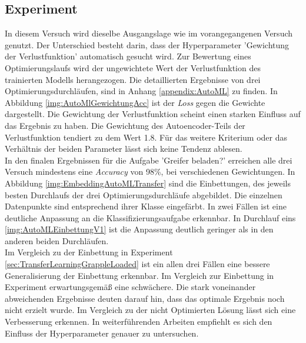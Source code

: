 	\subsection{Experiment}
	\label{subsec:AutoMLExperiment}
	In diesem Versuch wird dieselbe Ausgangslage wie im vorangegangenen Versuch genutzt. Der Unterschied besteht darin, dass der Hyperparameter 'Gewichtung der Verlustfunktion' automatisch gesucht wird. Zur Bewertung eines Optimierungslaufs wird der ungewichtete Wert der Verlustfunktion des trainierten Modells herangezogen. Die detaillierten Ergebnisse von drei Optimierungsdurchläufen, sind in Anhang \ref{appendix:AutoML} zu finden. In Abbildung \ref{img:AutoMlGewichtungAcc} ist der \textit{Loss} gegen die Gewichte dargestellt. Die Gewichtung der Verlustfunktion scheint einen starken Einfluss auf das Ergebnis zu haben. Die Gewichtung des Autoencoder-Teils der Verlustfunktion tendiert zu dem Wert 1.8. Für das weitere Kriterium oder das Verhältnis der beiden Parameter lässt sich keine Tendenz ablesen.  \\
	In den finalen Ergebnissen für die Aufgabe 'Greifer beladen?' erreichen alle drei Versuch mindestens eine \textit{Accuracy} von 98\%, bei verschiedenen Gewichtungen. In Abbildung \ref{img:EmbeddingAutoMLTransfer} sind die Einbettungen, des jeweils besten Durchlaufs der drei Optimierungsdurchläufe abgebildet. Die einzelnen Datenpunkte sind entsprechend ihrer Klasse eingefärbt. In zwei Fällen ist eine deutliche Anpassung an die Klassifizierungsaufgabe erkennbar. In Durchlauf eins \ref{img:AutoMLEinbettungV1} ist die Anpassung deutlich geringer als in den anderen beiden Durchläufen.\\
	Im Vergleich zu der Einbettung in Experiment \ref{sec:TransferLearningGrappleLoaded} ist ein allen drei Fällen eine bessere Generalisierung der Einbettung erkennbar. Im Vergleich zur Einbettung in Experiment 	\label{sec:MultiTaskGreifererkennung} erwartungsgemäß eine schwächere. Die stark voneinander abweichenden Ergebnisse deuten darauf hin, dass das optimale Ergebnis noch nicht erzielt wurde. Im Vergleich zu der nicht Optimierten Lösung lässt sich eine Verbesserung erkennen. In weiterführenden Arbeiten empfiehlt es sich den Einfluss der Hyperparameter genauer zu untersuchen.
